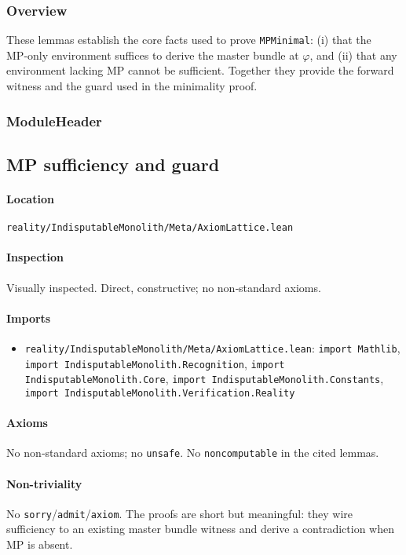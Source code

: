 \documentclass{article}
\newcommand{\FileRef}[1]{\texttt{#1}}
\newcommand{\ModuleHeader}[3]{%
  \subsection{#1}
  \paragraph{Location} \FileRef{#2}\\
  \paragraph{Inspection} #3
}
\begin{document}
\subsubsection{Overview}
These lemmas establish the core facts used to prove \texttt{MPMinimal}: (i) that the MP‑only environment suffices to derive the master bundle at \(\varphi\), and (ii) that any environment lacking MP cannot be sufficient. Together they provide the forward witness and the guard used in the minimality proof.

\subsubsection{ModuleHeader}
\ModuleHeader{MP sufficiency and guard}{reality/IndisputableMonolith/Meta/AxiomLattice.lean}{Visually inspected. Direct, constructive; no non‑standard axioms.}

\paragraph{Imports}
\begin{itemize}[leftmargin=*]
  \item \FileRef{reality/IndisputableMonolith/Meta/AxiomLattice.lean}: \texttt{import Mathlib}, \texttt{import IndisputableMonolith.Recognition}, \texttt{import IndisputableMonolith.Core}, \texttt{import IndisputableMonolith.Constants}, \texttt{import IndisputableMonolith.Verification.Reality}
\end{itemize}

\paragraph{Axioms}
No non‑standard axioms; no \texttt{unsafe}. No \texttt{noncomputable} in the cited lemmas.

\paragraph{Non-triviality}
No \texttt{sorry}/\texttt{admit}/\texttt{axiom}. The proofs are short but meaningful: they wire sufficiency to an existing master bundle witness and derive a contradiction when MP is absent.
\end{document}

